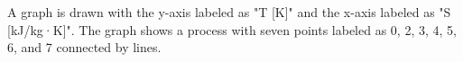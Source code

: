 A graph is drawn with the y-axis labeled as "T [K]" and the x-axis labeled as "S [kJ/kg·K]". The graph shows a process with seven points labeled as 0, 2, 3, 4, 5, 6, and 7 connected by lines.